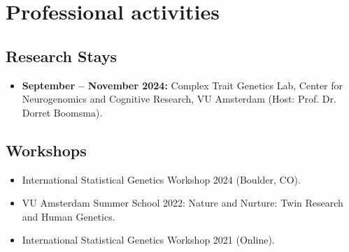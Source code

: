 \documentclass[10pt,a4paper]{article}
\begin{document}
\section*{Professional activities}
\subsection*{Research Stays}
\begin{itemize}
\item \textbf{September -- November 2024:} Complex Trait Genetics Lab, Center for Neurogenomics and Cognitive Research, VU Amsterdam (Host: Prof. Dr. Dorret Boomsma).
\end{itemize}

\subsection*{Workshops}
\begin{itemize}
\item International Statistical Genetics Workshop 2024 (Boulder, CO).
\item VU Amsterdam Summer School 2022: Nature and Nurture: Twin Research and Human Genetics.
\item International Statistical Genetics Workshop 2021 (Online).
\end{itemize}
\end{document}
